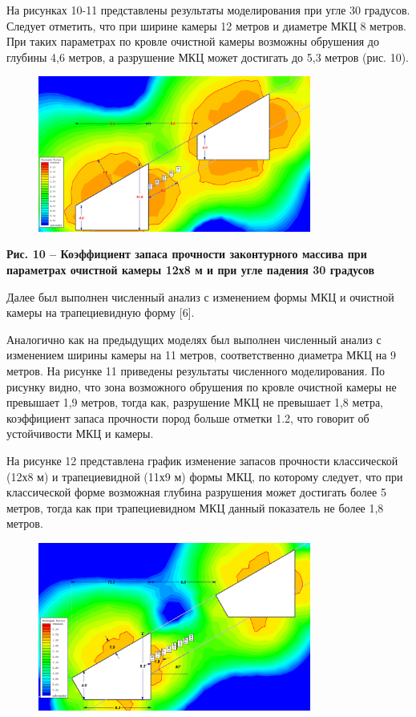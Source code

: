 На рисунках 10-11 представлены результаты моделирования при угле 30
градусов. Следует отметить, что при ширине камеры 12 метров и диаметре
МКЦ 8 метров. При таких параметрах по кровле очистной камеры возможны
обрушения до глубины 4,6 метров, а разрушение МКЦ может достигать до 5,3
метров (рис. 10).

\begin{figure}[H]
	\centering
	\includegraphics[width=0.8\textwidth]{assets/290}
	\caption*{}
\end{figure}

{\bfseries Рис. 10 -- Коэффициент запаса прочности законтурного массива при
параметрах очистной камеры 12х8 м и при угле падения 30 градусов}

Далее был выполнен численный анализ с изменением формы МКЦ и очистной
камеры на трапециевидную форму {[}6{]}.

Аналогично как на предыдущих моделях был выполнен численный анализ с
изменением ширины камеры на 11 метров, соответственно диаметра МКЦ на 9
метров. На рисунке 11 приведены результаты численного моделирования. По
рисунку видно, что зона возможного обрушения по кровле очистной камеры
не превышает 1,9 метров, тогда как, разрушение МКЦ не превышает 1,8
метра, коэффициент запаса прочности пород больше отметки 1.2, что
говорит об устойчивости МКЦ и камеры.

На рисунке 12 представлена график изменение запасов прочности
классической (12х8 м) и трапециевидной (11х9 м) формы МКЦ, по которому
следует, что при классической форме возможная глубина разрушения может
достигать более 5 метров, тогда как при трапециевидном МКЦ данный
показатель не более 1,8 метров.

\begin{figure}[H]
	\centering
	\includegraphics[width=0.8\textwidth]{assets/291}
	\caption*{}
\end{figure}

